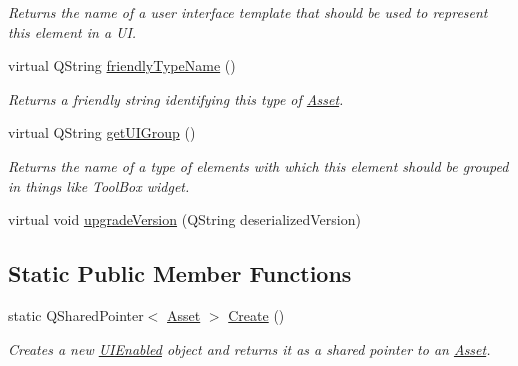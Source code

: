 \begin{DoxyCompactItemize}
\begin{DoxyCompactList}\small\item\em Returns the name of a user interface template that should be used to represent this element in a U\-I. \end{DoxyCompactList}\item 
virtual Q\-String \hyperlink{class_picto_1_1_u_i_enabled_a19f94929e12069750b29b87c581024b6}{friendly\-Type\-Name} ()
\begin{DoxyCompactList}\small\item\em Returns a friendly string identifying this type of \hyperlink{class_picto_1_1_asset}{Asset}. \end{DoxyCompactList}\item 
\hypertarget{class_picto_1_1_u_i_enabled_a16add5fce531bbf28922a2d4cb99c615}{virtual Q\-String \hyperlink{class_picto_1_1_u_i_enabled_a16add5fce531bbf28922a2d4cb99c615}{get\-U\-I\-Group} ()}\label{class_picto_1_1_u_i_enabled_a16add5fce531bbf28922a2d4cb99c615}

\begin{DoxyCompactList}\small\item\em Returns the name of a type of elements with which this element should be grouped in things like Tool\-Box widget. \end{DoxyCompactList}\item 
virtual void \hyperlink{class_picto_1_1_u_i_enabled_a12c0d0357c85854db9220c72c4941b15}{upgrade\-Version} (Q\-String deserialized\-Version)
\end{DoxyCompactItemize}
\subsection*{Static Public Member Functions}
\begin{DoxyCompactItemize}
\item 
\hypertarget{class_picto_1_1_u_i_enabled_a150caa9544965aea41579bc38e9e2ac5}{static Q\-Shared\-Pointer$<$ \hyperlink{class_picto_1_1_asset}{Asset} $>$ \hyperlink{class_picto_1_1_u_i_enabled_a150caa9544965aea41579bc38e9e2ac5}{Create} ()}\label{class_picto_1_1_u_i_enabled_a150caa9544965aea41579bc38e9e2ac5}

\begin{DoxyCompactList}\small\item\em Creates a new \hyperlink{class_picto_1_1_u_i_enabled}{U\-I\-Enabled} object and returns it as a shared pointer to an \hyperlink{class_picto_1_1_asset}{Asset}. \end{DoxyCompactList}\end{DoxyCompactItemize}
